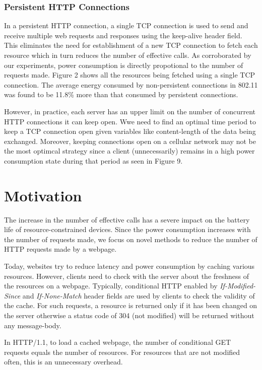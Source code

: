 \documentclass{sigplanconf}
\begin{document}
\subsubsection{Persistent HTTP Connections}

In a persistent HTTP connection, a single TCP connection is used to send and receive multiple web requests and responses using the keep-alive header field. This eliminates the need for establishment of a new TCP connection to fetch each resource which in turn reduces the number of effective calls. As corroborated by our experiments, power consumption is directly propotional to the number of requests made. Figure 2 shows all the resources being fetched using a single TCP connection. The average energy consumed by non-persistent connections in 802.11 was found to be 11.8\% more than that consumed by persistent connections.

However, in practice, each server has an upper limit on the number of concurrent HTTP connections it can keep open. Wwe need to find an optimal time period to keep a TCP connection open given variables like content-length of the data being exchanged. Moreover, keeping connections open on a cellular network may not be the most optimcal strategy since a client (unnecessarily) remains in a high power consumption state during that period as seen in Figure 9. 

\section{Motivation}
The increase in the number of effective calls has a severe impact on the battery life of resource-constrained devices. Since the power consumption increases with the number of requests made, we focus on novel methods to reduce the number of HTTP requests made by a webpage.

Today, websites try to reduce latency and power consumption by caching various resources. However, clients need to check with the server about the freshness of the resources on a webpage. Typically, conditional HTTP enabled by {\it If-Modified-Since} and {\it If-None-Match} header fields are used by clients to check the validity of the cache. For such requests, a resource is returned only if it has been changed on the server otherwise a status code of 304 (not modified) will be returned without any message-body. 

In HTTP/1.1, to load a cached webpage, the number of conditional GET requests equals the number of resources. For resources that are not modified often, this is an unnecessary overhead.
\end{document}
